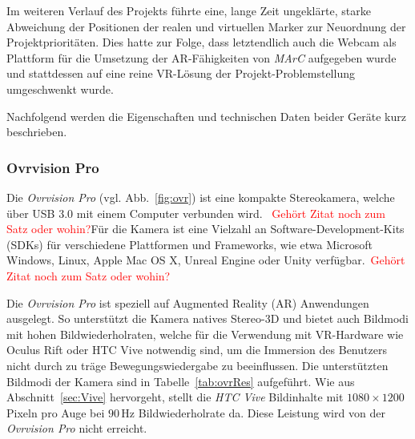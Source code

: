 Im weiteren Verlauf des Projekts führte eine, lange Zeit ungeklärte, starke Abweichung der Positionen der realen und virtuellen Marker zur Neuordnung der Projektprioritäten. Dies hatte zur Folge, dass letztendlich auch die Webcam als Plattform für die Umsetzung der AR-Fähigkeiten von \emph{MArC} aufgegeben wurde und stattdessen auf eine reine VR-Lösung der Projekt-Problemstellung umgeschwenkt wurde.

Nachfolgend werden die Eigenschaften und technischen Daten beider Geräte kurz beschrieben.
\subsubsection{Ovrvision Pro}\label{sec:ovrvision}
Die \emph{Ovrvision Pro} (vgl. Abb.~\ref{fig:ovr}) ist eine kompakte Stereokamera, welche über USB 3.0 mit einem Computer verbunden wird.~\cite{website:ovrvision}  \textcolor{red}{Gehört Zitat noch zum Satz oder wohin?}Für die Kamera ist eine Vielzahl an Software-Development-Kits (SDKs) für verschiedene Plattformen und Frameworks, wie etwa Microsoft Windows, Linux, Apple Mac OS X, Unreal Engine oder Unity verfügbar.~\cite{website:ovrvisionSetup}\textcolor{red}{Gehört Zitat noch zum Satz oder wohin?}

Die \emph{Ovrvision Pro} ist speziell auf Augmented Reality (AR) Anwendungen ausgelegt. So unterstützt die Kamera natives Stereo-3D und bietet auch Bildmodi mit hohen Bildwiederholraten, welche für die Verwendung mit VR-Hardware wie Oculus Rift oder HTC Vive notwendig sind, um die Immersion des Benutzers nicht durch zu träge Bewegungswiedergabe zu beeinflussen. Die unterstützten Bildmodi der Kamera sind in Tabelle~\ref{tab:ovrRes} aufgeführt. Wie aus Abschnitt~\ref{sec:Vive} hervorgeht, stellt die \textit{HTC Vive} Bildinhalte mit $1080\times1200$\,Pixeln pro Auge bei $90$\,Hz Bildwiederholrate da. Diese Leistung wird von der \emph{Ovrvision Pro} nicht erreicht.

